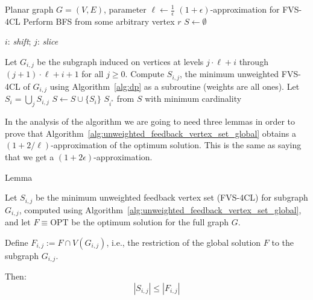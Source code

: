 \begin{algorithm}[H]
    \caption{Baker's technique for the unweighted FVS-4CL}
    \label{alg:unweighted_feedback_vertex_set_global}
    \begin{algorithmic}[1]
    \REQUIRE Planar graph $G = (V, E)$, parameter $\ell \leftarrow \frac{1}{\epsilon}$
    \ENSURE $(1 + \epsilon)$-approximation for \textsc{FVS-4CL}
    \STATE Perform \textsc{BFS} from some arbitrary vertex $r$ \label{alg3:line1}
    \STATE $S \leftarrow \emptyset$

    $i$: \textit{shift}; $j$: \textit{slice}

     \label{alg3:for-loop}
        \STATE Let $G_{i, j}$ be the subgraph induced on vertices at levels
        $j \cdot \ell + i$ through $(j+1) \cdot \ell + i + 1$ for all $j \geq 0$. \label{alg3:line4}
        \STATE Compute $S_{i, j}$, the minimum unweighted \textsc{FVS-4CL} of $G_{i, j}$ using Algorithm~\ref{alg:dp} as a subroutine (weights are all ones). \label{alg3:subroutine}
        \STATE Let $S_i = \bigcup_{j} S_{i, j}$ \label{alg3:line6}
        \STATE $S \leftarrow S \cup \{S_i\}$ \label{alg3:line7}
    \ENDFOR
    \RETURN $S_{i^*}$ from $S$ with minimum cardinality \label{alg3:line9}
    \end{algorithmic}
\end{algorithm}


In the analysis of the algorithm we are going to need three lemmas in order 
to prove that Algorithm~\ref{alg:unweighted_feedback_vertex_set_global} obtains a 
$(1 + 2/\ell)$-approximation of the optimum solution. This is the same as saying that we 
get a $(1 + 2\epsilon)$-approximation.

\begin{mydefinition}{Lemma}
    \label{lemma:opt-unweighted-fvs-4cl}
    
    Let \( S_{i,j} \) be the minimum unweighted feedback vertex set (FVS-4CL)
    for subgraph \( G_{i,j} \), computed using 
    Algorithm~\ref{alg:unweighted_feedback_vertex_set_global}, and let 
    \( F \equiv \text{OPT} \) be the optimum solution for the full graph \( G \).
    
    Define \( F_{i,j} := F \cap V(G_{i,j}) \), i.e., the restriction of the global solution \( F \) to the subgraph \( G_{i,j} \).
    
    Then:
    \[
    |S_{i,j}| \leq |F_{i,j}|
    \]
\end{mydefinition}
    

